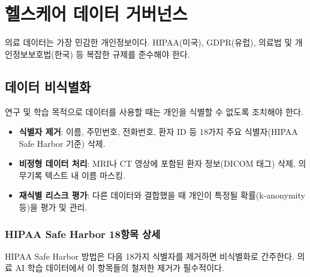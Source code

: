 \section{헬스케어 데이터 거버넌스}
\label{sec:16.3}

의료 데이터는 가장 민감한 개인정보이다. HIPAA(미국), GDPR(유럽), 의료법 및 개인정보보호법(한국) 등 복잡한 규제를 준수해야 한다\cite{price2019privacy}.

\subsection{데이터 비식별화}
\label{sec:16.3.1}

연구 및 학습 목적으로 데이터를 사용할 때는 개인을 식별할 수 없도록 조치해야 한다.

\begin{itemize}
 \item \textbf{식별자 제거}: 이름, 주민번호, 전화번호, 환자 ID 등 18가지 주요 식별자(HIPAA Safe Harbor 기준) 삭제.
 \item \textbf{비정형 데이터 처리}: MRI나 CT 영상에 포함된 환자 정보(DICOM 태그) 삭제, 의무기록 텍스트 내 이름 마스킹.
 \item \textbf{재식별 리스크 평가}: 다른 데이터와 결합했을 때 개인이 특정될 확률(k-anonymity 등)을 평가 및 관리.
\end{itemize}

\subsubsection{HIPAA Safe Harbor 18항목 상세}

HIPAA Safe Harbor 방법은 다음 18가지 식별자를 제거하면 비식별화로 간주한다. 의료 AI 학습 데이터에서 이 항목들의 철저한 제거가 필수적이다.

